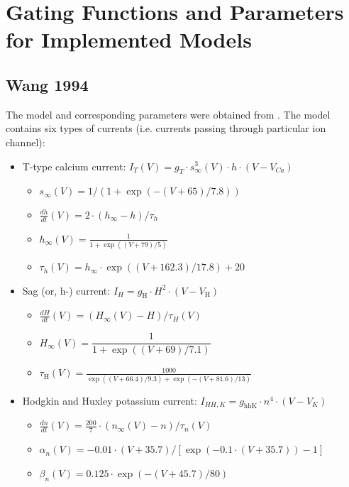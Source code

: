 \documentclass[../main.tex]{subfiles}
\begin{document}
\section{Gating Functions and Parameters for Implemented Models} \label{appendix:functions_and_parameters}

\subsection{Wang 1994}

The model and corresponding parameters were obtained from \cite{wangMultipleDynamicalModes1994}.
The model contains six types of currents (i.e. currents passing through particular ion channel):
\begin{itemize}
    \item T-type calcium current: $I_{T}(V)=g_T \cdot s_\infty^3(V) \cdot h \cdot (V - V_{Ca})$
    \begin{itemize}[label=\textopenbullet]
        \item $s_\infty(V)=1/(1+\exp(-(V+65)/7.8))$
        \item $\frac{dh}{dt}(V)=2\cdot(h_\infty - h)/\tau_h$
        \item $h_\infty(V)=\frac{1}{1 + \exp((V + 79)/5)}$
        \item $\tau_h(V)=h_\infty \cdot \exp((V + 162.3)/17.8) + 20$
    \end{itemize}
    \item Sag (or, h-) current: $I_{H}=g_{\text{H}} \cdot H^2 \cdot (V - V_{\text{H}})$
    \begin{itemize}[label=\textopenbullet]
        \item $\frac{dH}{dt}(V)=(H_\infty(V) - H)/\tau_{H}(V)$
        \item $H_\infty(V)=\dfrac{1}{1 + \exp((V + 69)/7.1)}$
        \item $\tau_{\text{H}}(V)=\frac{1000}{\exp((V + 66.4)/9.3) + \exp(-(V + 81.6)/13)}$
    \end{itemize}
    \item Hodgkin and Huxley potassium current: $I_{HH,K}=g_{\text{hhK}} \cdot n^4 \cdot (V - V_K)$
    \begin{itemize}[label=\textopenbullet]
        \item $\frac{dn}{dt}(V)=\frac{200}{7} \cdot (n_\infty(V) - n)/\tau_n(V)$
        \item $\alpha_n(V)=-0.01 \cdot (V + 35.7)/[\exp(-0.1 \cdot (V + 35.7)) - 1]$
        \item $\beta_n(V)=0.125 \cdot \exp(-(V + 45.7)/80)$

\end{itemize}
\end{itemize}
\end{document}
